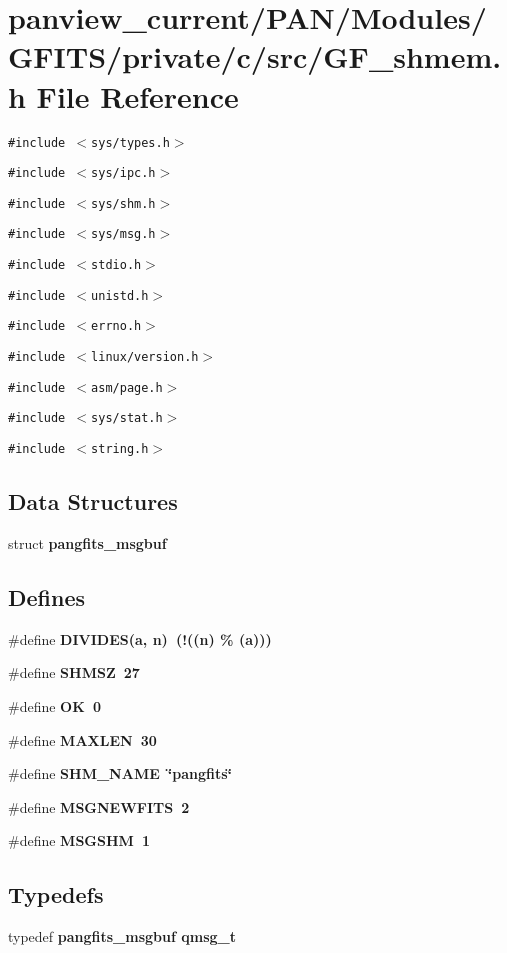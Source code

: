 \section{panview\_\-current/PAN/Modules/GFITS/private/c/src/GF\_\-shmem.h File Reference}
\label{GF__shmem_8h}
{\tt \#include $<$sys/types.h$>$}\par
{\tt \#include $<$sys/ipc.h$>$}\par
{\tt \#include $<$sys/shm.h$>$}\par
{\tt \#include $<$sys/msg.h$>$}\par
{\tt \#include $<$stdio.h$>$}\par
{\tt \#include $<$unistd.h$>$}\par
{\tt \#include $<$errno.h$>$}\par
{\tt \#include $<$linux/version.h$>$}\par
{\tt \#include $<$asm/page.h$>$}\par
{\tt \#include $<$sys/stat.h$>$}\par
{\tt \#include $<$string.h$>$}\par
\subsection*{Data Structures}
\begin{CompactItemize}
\item 
struct \bf{pangfits\_\-msgbuf}
\end{CompactItemize}
\subsection*{Defines}
\begin{CompactItemize}
\item 
\#define \bf{DIVIDES}(a, n)~(!((n) \% (a)))
\item 
\#define \bf{SHMSZ}~27
\item 
\#define \bf{OK}~0
\item 
\#define \bf{MAXLEN}~30
\item 
\#define \bf{SHM\_\-NAME}~\char`\"{}pangfits\char`\"{}
\item 
\#define \bf{MSGNEWFITS}~2
\item 
\#define \bf{MSGSHM}~1
\end{CompactItemize}
\subsection*{Typedefs}
\begin{CompactItemize}
\item 
typedef \bf{pangfits\_\-msgbuf} \bf{qmsg\_\-t}
\end{CompactItemize}
